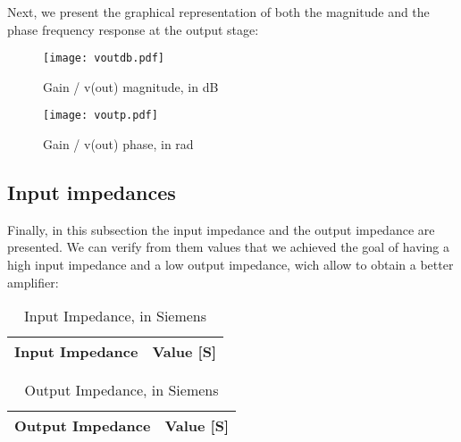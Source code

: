  Next, we present the graphical representation of both the magnitude and the phase frequency response at the output stage:
 

\begin{figure}[H] \centering
\texttt{[image: voutdb.pdf]}
\caption{Gain / v(out) magnitude, in dB}
\label{fig:voutdb}
\end{figure}

\begin{figure}[H] \centering
\texttt{[image: voutp.pdf]}
\caption{Gain / v(out) phase, in rad}
\label{fig:voutp}
\end{figure}


\subsection{Input impedances}
Finally, in this subsection the input impedance and the output impedance are presented. We can verify from them values that we achieved the goal of having a high input impedance and a low output impedance, wich allow to obtain a better amplifier:


\begin{table}[H]
  \centering
  \begin{tabular}{|l|r|}
    \hline    
    {\bf Input Impedance} & {\bf Value [S]} \\ \hline
    
  \end{tabular}
  \caption{Input Impedance, in Siemens}
  \label{tab:input_z}
\end{table}


\begin{table}[H]
  \centering
  \begin{tabular}{|l|r|}
    \hline    
    {\bf Output Impedance} & {\bf Value [S]} \\ \hline
    
  \end{tabular}
  \caption{Output Impedance, in Siemens}
  \label{tab:output_z}
\end{table}



